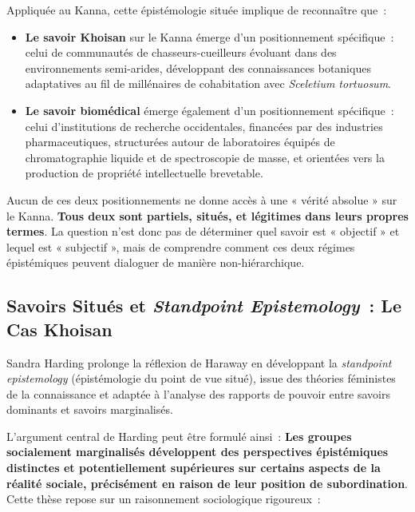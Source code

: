 \documentclass[12pt,a4paper,twoside]{book}
\newcommand{\kanna}{\textit{Sceletium tortuosum}}
\begin{document}
Appliquée au Kanna, cette épistémologie située implique de reconnaître que~:

\begin{itemize}
\item \textbf{Le savoir Khoisan} sur le Kanna émerge d'un positionnement spécifique~: celui de communautés de chasseurs-cueilleurs évoluant dans des environnements semi-arides, développant des connaissances botaniques adaptatives au fil de millénaires de cohabitation avec \kanna{}.

\item \textbf{Le savoir biomédical} émerge également d'un positionnement spécifique~: celui d'institutions de recherche occidentales, financées par des industries pharmaceutiques, structurées autour de laboratoires équipés de chromatographie liquide et de spectroscopie de masse, et orientées vers la production de propriété intellectuelle brevetable.
\end{itemize}

Aucun de ces deux positionnements ne donne accès à une « vérité absolue » sur le Kanna. \textbf{Tous deux sont partiels, situés, et légitimes dans leurs propres termes}. La question n'est donc pas de déterminer quel savoir est « objectif » et lequel est « subjectif », mais de comprendre comment ces deux régimes épistémiques peuvent dialoguer de manière non-hiérarchique.

\subsection{Savoirs Situés et \textit{Standpoint Epistemology}~: Le Cas Khoisan}

Sandra Harding \parencite{harding1998,harding2008} prolonge la réflexion de Haraway en développant la \textit{standpoint epistemology} (épistémologie du point de vue situé), issue des théories féministes de la connaissance et adaptée à l'analyse des rapports de pouvoir entre savoirs dominants et savoirs marginalisés.

L'argument central de Harding peut être formulé ainsi~: \textbf{Les groupes socialement marginalisés développent des perspectives épistémiques distinctes et potentiellement supérieures sur certains aspects de la réalité sociale, précisément en raison de leur position de subordination}. Cette thèse repose sur un raisonnement sociologique rigoureux~:
\end{document}
